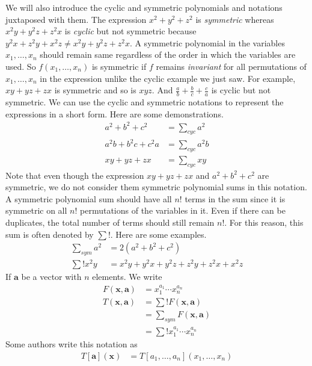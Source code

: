 \documentclass{subfile}
\begin{document}
	We will also introduce the cyclic and symmetric polynomials and notations juxtaposed with them. The expression $x^{2}+y^{2}+z^{2}$ is \textit{symmetric} whereas $x^{2}y+y^{2}z+z^{2}x$ is \textit{cyclic} but not symmetric because $y^{2}x+z^{2}y+x^{2}z\neq x^{2}y+y^{2}z+z^{2}x$. A symmetric polynomial in the variables $x_{1},\ldots,x_{n}$ should remain same regardless of the order in which the variables are used. So $f(x_{1},\ldots,x_{n})$ is symmetric if $f$ remains \textit{invariant} for all permutations of $x_{1},\ldots,x_{n}$ in the expression unlike the cyclic example we just saw. For example, $xy+yz+zx$ is symmetric and so is $xyz$. And $\frac{a}{b}+\frac{b}{c}+\frac{c}{a}$ is cyclic but not symmetric. We can use the cyclic and symmetric notations to represent the expressions in a short form. Here are some demonstrations.
		\begin{align*}
			a^{2}+b^{2}+c^{2}
				& = \sum_{cyc}a^{2}\\
			a^{2}b+b^{2}c+c^{2}a
				& = \sum_{cyc}a^{2}b\\
			xy+yz+zx
				& = \sum_{cyc}xy
		\end{align*}
	Note that even though the expression $xy+yz+zx$ and $a^{2}+b^{2}+c^{2}$ are symmetric, we do not consider them symmetric polynomial sums in this notation. A symmetric polynomial sum should have all $n!$ terms in the sum since it is symmetric on all $n!$ permutations of the variables in it. Even if there can be duplicates, the total number of terms should still remain $n!$. For this reason, this sum is often denoted by $\sum{!}$. Here are some examples.
		\begin{align*}
			\sum_{sym}a^{2}
				& = 2(a^{2}+b^{2}+c^{2})\\
			\sum{!} x^{2}y
				& = x^{2}y+y^{2}x+y^{2}z+z^{2}y+z^{2}x+x^{2}z
		\end{align*}
	If $\mathbf{a}$ be a vector with $n$ elements. We write
		\begin{align*}
			F(\mathbf{x}, \mathbf{a})
				& = x_{1}^{a_{1}}\cdots x_{n}^{a_{n}}\\
			T(\mathbf{x},\mathbf{a})
				& = \sum{!}F(\mathbf{x},\mathbf{a})\\
				& = \sum_{sym} F(\mathbf{x},\mathbf{a})\\
				& = \sum{!}x_{1}^{a_{1}}\cdots x_{n}^{a_{n}}
		\end{align*}
	Some authors write this notation as
		\begin{align*}
			T[\mathbf{a}](\mathbf{x})
				& = T[a_{1},\ldots,a_{n}](x_{1},\ldots,x_{n})
		\end{align*}
\end{document}
